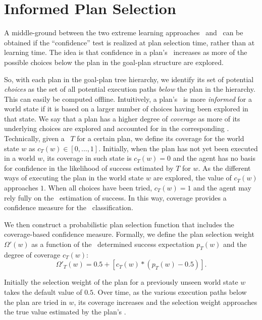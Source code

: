 \section{Informed Plan Selection}\label{sec:coverage}

A middle-ground between the two extreme learning approaches \CL\ and \BUL\ can be
obtained if the ``confidence'' test is realized at plan selection time, rather
than at learning time.
The idea is that confidence in a plan's \dt\ increases as more of the possible
choices below the plan in the goal-plan structure are explored.


So, with each plan in the goal-plan tree hierarchy, we identify its set of
potential \textit{choices} as the set of all potential execution paths
\textit{below} the plan in the hierarchy. This can easily be computed offline.
Intuitively, a plan's \dt\ is more \textit{informed} for a world state if it is
based on a larger number of choices having been explored in that state. We say
that a plan has a higher degree of \emph{coverage} as more of its underlying
choices are explored and accounted for in the corresponding \dt. Technically,
given a \dt\ $T$ for a certain plan, we define its coverage for the world state
$w$ as $c_T(w) \in [0,\ldots,1]$.
Initially, when the plan has not yet been executed in a world $w$, its coverage
in such state is $c_T(w) = 0$ and the agent has no basis for confidence in the
likelihood of success estimated by $T$ for $w$.
As the different ways of executing the plan in the world state $w$ are explored,
the value of $c_T(w)$ approaches $1$. When all choices have been tried,
$c_T(w)=1$ and the agent may rely fully on the \dt\ estimation of success.
In this way, coverage provides a confidence measure for the \dt\ classification.


We then construct a probabilistic plan selection function that includes the
coverage-based confidence measure.
Formally, we define the plan selection weight $\Omega'(w)$ as a function of the
\dt\ determined success expectation $p_T(w)$ and the degree of coverage $c_T(w)$:
\begin{equation*}\label{eqn:coverage}   
\Omega'_T(w) = 0.5 + \left[  c_T(w) *  \left( p_T(w) - 0.5 \right)  \right].
\end{equation*}
	
	
Initially the selection weight of the plan for a previously unseen world state
$w$ takes the default value of $0.5$.
Over time, as the various execution paths below the plan are tried in $w$, its
coverage increases and the selection weight approaches the true value estimated
by the plan's \dt.


